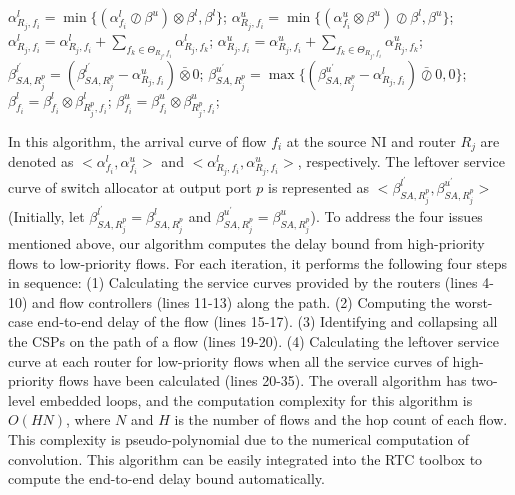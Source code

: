 \documentclass[10pt,journal]{IEEEtran}
\begin{document}
\begin{algorithm}
\begin{algorithmic}[1]
                \STATE $\alpha^l_{R_j,f_i}=\min\{(\alpha^l_{f_i}\oslash\beta^u)\otimes\beta^l,\beta^l\}$;
                \STATE $\alpha^u_{R_j,f_i}=\min\{(\alpha^u_{f_i}\otimes\beta^u)\oslash\beta^l,\beta^u\}$;
                    \STATE $\alpha^l_{R_j,f_i}=\alpha^l_{R_j,f_i}+\sum_{f_k\in\Theta_{R_j,f_i}}\alpha^l_{R_j,f_k}$;
                    \STATE $\alpha^u_{R_j,f_i}=\alpha^u_{R_j,f_i}+\sum_{f_k\in\Theta_{R_j,f_i}}\alpha^u_{R_j,f_k}$;
                    \STATE $\beta^{l^\prime}_{SA,R_j^{p}}=(\beta^{l^\prime}_{SA,R_j^{p}}-\alpha^u_{R_j,f_i})\bar{\otimes}0$;
                    \STATE $\beta^{u^\prime}_{SA,R_j^{p}}=\max\{(\beta^{u^\prime}_{SA,R_j^{p}}-\alpha^l_{R_j,f_i})\bar{\oslash}0,0\}$;
                \ENDIF
            \ENDIF
            \STATE $\beta_{f_i}^l=\beta_{f_i}^l\otimes\beta^l_{R_j^{p},f_i}$; $\beta_{f_i}^u=\beta_{f_i}^u\otimes\beta^u_{R_j^{p},f_i}$;
        \ENDFOR
    \ENDFOR
\end{algorithmic}
\end{algorithm}

In this algorithm, the arrival curve of flow $f_i$ at the source NI and router $R_j$ are denoted as $<\alpha_{f_i}^l,\alpha_{f_i}^u>$ and $<\alpha_{R_j,f_i}^l,\alpha_{R_j,f_i}^u>$, respectively. The leftover service curve of switch allocator at output port $p$ is represented as $<\beta_{SA,R_j^{p}}^{l^\prime},\beta_{SA,R_j^{p}}^{u^\prime}>$ (Initially, let $\beta_{SA,R_j^{p}}^{l^\prime}=\beta_{SA,R_j^{p}}^{l}$ and $\beta_{SA,R_j^{p}}^{u^\prime}=\beta_{SA,R_j^{p}}^{u}$). To address the four issues mentioned above, our algorithm computes the delay bound from high-priority flows to low-priority flows. For each iteration, it performs the following four steps in sequence: (1) Calculating the service curves provided by the routers (lines 4-10) and flow controllers (lines 11-13) along the path. (2) Computing the worst-case end-to-end delay of the flow (lines 15-17). (3) Identifying and collapsing all the CSPs on the path of a flow (lines 19-20). (4) Calculating the leftover service curve at each router for low-priority flows when all the service curves of high-priority flows have been calculated (lines 20-35). The overall algorithm has two-level embedded loops, and the computation complexity for this algorithm is $O(HN)$, where $N$ and $H$ is the number of flows and the hop count of each flow. This complexity is pseudo-polynomial due to the numerical computation of convolution. This algorithm can be easily integrated into the RTC toolbox \cite{rtc} to compute the end-to-end delay bound automatically.
\end{document}
